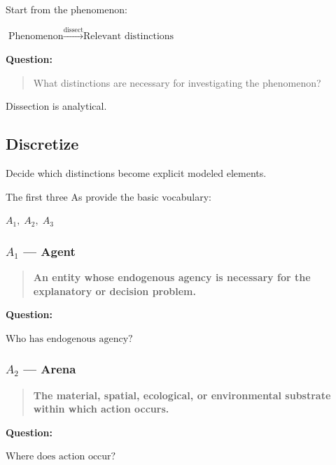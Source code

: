 \documentclass[11pt,a4paper]{article}
\newenvironment{fitdisplay}{\par\medskip\noindent\begin{lrbox}{\displaybox}$\displaystyle}{%
$\end{lrbox}\makebox[\linewidth][c]{\ifdim\wd\displaybox>\linewidth\resizebox{\linewidth}{!}{\usebox{\displaybox}}\else\usebox{\displaybox}\fi}\par\medskip}
\begin{document}
Start from the phenomenon:

\begin{fitdisplay}
\text{Phenomenon}
\xrightarrow{\text{dissect}}
\text{Relevant distinctions}
\end{fitdisplay}

\textbf{Question:}

\begin{quote}
What distinctions are necessary for investigating the phenomenon?
\end{quote}

Dissection is analytical.



\subsection{Discretize}

Decide which distinctions become explicit modeled elements.

The first three As provide the basic vocabulary:

\begin{fitdisplay}
\boxed{A_1,\;A_2,\;A_3}
\end{fitdisplay}

\subsubsection{\(A_1\) --- Agent}

\begin{quote}
\textbf{An entity whose endogenous agency is necessary for the explanatory or decision problem.}
\end{quote}

\textbf{Question:}

\begin{fitdisplay}
\boxed{\text{Who has endogenous agency?}}
\end{fitdisplay}

\subsubsection{\(A_2\) --- Arena}

\begin{quote}
\textbf{The material, spatial, ecological, or environmental substrate within which action occurs.}
\end{quote}

\textbf{Question:}

\begin{fitdisplay}
\boxed{\text{Where does action occur?}}
\end{fitdisplay}
\end{document}
